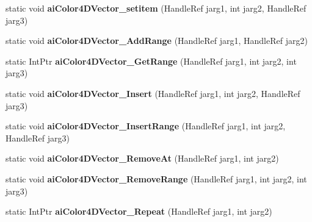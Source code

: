 \begin{DoxyCompactItemize}
\item 
\hypertarget{class_assimp_p_i_n_v_o_k_e_a6abae485a9bee660c8e94444e8f5bff7}{static void {\bfseries ai\+Color4\+D\+Vector\+\_\+setitem} (Handle\+Ref jarg1, int jarg2, Handle\+Ref jarg3)}\label{class_assimp_p_i_n_v_o_k_e_a6abae485a9bee660c8e94444e8f5bff7}

\item 
\hypertarget{class_assimp_p_i_n_v_o_k_e_a8a30d22b3dda629939d14c2c557fa3e0}{static void {\bfseries ai\+Color4\+D\+Vector\+\_\+\+Add\+Range} (Handle\+Ref jarg1, Handle\+Ref jarg2)}\label{class_assimp_p_i_n_v_o_k_e_a8a30d22b3dda629939d14c2c557fa3e0}

\item 
\hypertarget{class_assimp_p_i_n_v_o_k_e_ae4207a5b73df753aa2dfd850d5e3d7d7}{static Int\+Ptr {\bfseries ai\+Color4\+D\+Vector\+\_\+\+Get\+Range} (Handle\+Ref jarg1, int jarg2, int jarg3)}\label{class_assimp_p_i_n_v_o_k_e_ae4207a5b73df753aa2dfd850d5e3d7d7}

\item 
\hypertarget{class_assimp_p_i_n_v_o_k_e_aba5fb886d06c484ea78cfa4f1e91d53d}{static void {\bfseries ai\+Color4\+D\+Vector\+\_\+\+Insert} (Handle\+Ref jarg1, int jarg2, Handle\+Ref jarg3)}\label{class_assimp_p_i_n_v_o_k_e_aba5fb886d06c484ea78cfa4f1e91d53d}

\item 
\hypertarget{class_assimp_p_i_n_v_o_k_e_a4a216dc62b4231e09da5a145686ceae4}{static void {\bfseries ai\+Color4\+D\+Vector\+\_\+\+Insert\+Range} (Handle\+Ref jarg1, int jarg2, Handle\+Ref jarg3)}\label{class_assimp_p_i_n_v_o_k_e_a4a216dc62b4231e09da5a145686ceae4}

\item 
\hypertarget{class_assimp_p_i_n_v_o_k_e_a0088e1eb95619e7af33156114ff290b6}{static void {\bfseries ai\+Color4\+D\+Vector\+\_\+\+Remove\+At} (Handle\+Ref jarg1, int jarg2)}\label{class_assimp_p_i_n_v_o_k_e_a0088e1eb95619e7af33156114ff290b6}

\item 
\hypertarget{class_assimp_p_i_n_v_o_k_e_ad0bc9c39890b70b4ad0d335b52e86ff1}{static void {\bfseries ai\+Color4\+D\+Vector\+\_\+\+Remove\+Range} (Handle\+Ref jarg1, int jarg2, int jarg3)}\label{class_assimp_p_i_n_v_o_k_e_ad0bc9c39890b70b4ad0d335b52e86ff1}

\item 
\hypertarget{class_assimp_p_i_n_v_o_k_e_a637d591f2cc8231a76fb0a4e6df642e2}{static Int\+Ptr {\bfseries ai\+Color4\+D\+Vector\+\_\+\+Repeat} (Handle\+Ref jarg1, int jarg2)}\label{class_assimp_p_i_n_v_o_k_e_a637d591f2cc8231a76fb0a4e6df642e2}


\end{DoxyCompactItemize}
